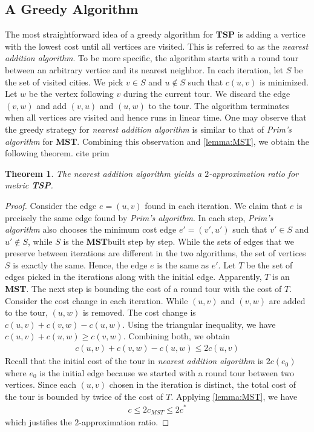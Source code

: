 \documentclass[11pt,psfig,times]{article}
\newcommand*{\mst}{\textbf{MST}}
\newtheorem{theorem}{Theorem}
\begin{document}
\subsection{A Greedy Algorithm}
The most straightforward idea of a greedy algorithm for \textbf{TSP} is adding a vertice with the lowest cost until all vertices are visited. 
This is referred to as the \textit{nearest addition algorithm}. To be more specific, the algorithm starts with a round tour between an arbitrary vertice and its 
nearest neighbor. In each iteration, let $S$ be the set of visited cities. We pick $v \in S$ and $u \not\in S$ such that 
$c(u, v)$ is minimized. Let $w$ be the vertex following $v$ during the current tour. We discard the edge $(v, w)$ and add $(v, u)$ and $(u, w)$ to the tour.
The algorithm terminates when all vertices are visited and hence runs in linear time. 
One may observe that the greedy strategy for \textit{nearest addition algorithm} is similar to that of \textit{Prim's algorithm} for \textbf{MST}.
Combining this observation and \cref{lemma:MST}, we obtain the following theorem. \color{red} cite prim \color{black}
\begin{theorem}
    The \textit{nearest addition algorithm} yields a $2$-approximation ratio for metric \textbf{TSP}.
\end{theorem}
\begin{proof}
    Consider the edge $e = (u, v)$ found in each iteration. We claim that $e$ is precisely the same edge found by \textit{Prim's algorithm}.
    In each step, \textit{Prim's algorithm} also chooses the minimum cost edge $e' = (v', u')$ such that $v' \in S$ and $u' \not\in S$, while 
    $S$ is the \mst built step by step. While the sets of edges that we preserve between iterations are different in the two algorithms, 
    the set of vertices $S$ is exactly the same. Hence, the edge $e$ is the same as $e'$. 
    Let $T$ be the set of edges picked in the iterations along with the initial edge. Apparently, $T$ is an \mst. The next step is bounding 
    the cost of a round tour with the cost of $T$. \\
    Consider the cost change in each iteration. While $(u, v)$ and $(v, w)$ are added to the tour, $(u, w)$ is removed. The cost change is $c(u, v) + c(v, w) - c(u, w)$.
    Using the triangular inequality, we have $c(u, v) + c(u, w) \geq c(v, w)$. Combining both, we obtain 
    \begin{align*}
        c(u, v) + c(v, w) - c(u, w) \leq 2c(u, v)
    \end{align*}
    Recall that the initial cost of the tour in \textit{nearest addition algorithm} is $2c(e_0)$ where $e_0$ is the initial edge because we started 
    with a round tour between two vertices. Since each $(u, v)$ chosen in the iteration is distinct, the total cost of the tour is bounded by 
    twice of the cost of $T$. Applying \cref{lemma:MST}, we have
    \begin{align*}
        c \leq 2 c_{MST} \leq 2 c^*
    \end{align*}
    which justifies the $2$-approximation ratio.
\end{proof}
\end{document}
